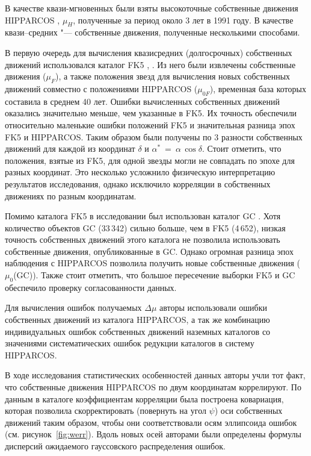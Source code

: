 В качестве квази-мгновенных были взяты высокоточные собственные движения HIPPARCOS \cite{1997ESASP1200.....E}, $\mu_{H}$, полученные за период около 3 лет в 1991 году. В качестве квази--средних "--- собственные движения, полученные несколькими способами. 

В первую очередь для вычисления квазисредних (\glqq долгосрочных\grqq ) собственных движений использовался каталог FK5 \cite{1988VeARI..32....1F}, \cite{1991VeARI..33....1F}. Из него были извлечены собственные движения ($\mu_F$), а также положения звезд для вычисления новых собственных движений совместно с положениями HIPPARCOS ($\mu_{0F}$), временная база которых составила в среднем 40 лет. Ошибки вычисленных собственных движений оказались значительно меньше, чем указанные в FK5. Их точность обеспечили относительно маленькие ошибки положений FK5 и значительная разница эпох FK5 и HIPPARCOS. Таким образом были получены по 3 разности собственных движений для каждой из координат $\delta$  и $\alpha ^*$~=~$\alpha\,\cos\delta$. Стоит отметить, что положения, взятые из FK5, для одной звезды могли не совпадать по эпохе для разных координат. Это несколько усложнило физическую интерпретацию результатов исследования, однако исключило корреляции в собственных движениях по разным координатам.

Помимо каталога FK5 в исследовании был использован каталог GC \cite{1936gcts.book.....B}. Хотя количество объектов GC (33\,342) сильно больше, чем в FK5 (4\,652), низкая точность собственных движений этого каталога не позволила использовать собственные движения, опубликованные в GC. Однако огромная разница эпох наблюдения с HIPPARCOS позволила получить новые собственные движения ($\mu_{0}$(GC)). Также стоит отметить, что большое пересечение выборки FK5 и GC обеспечило проверку согласованности данных.

Для вычисления ошибок получаемых $\Delta\mu$ авторы использовали ошибки собственных движений из каталога HIPPARCOS, а так же комбинацию индивидуальных ошибок собственных движений наземных каталогов со значениями систематических ошибок редукции каталогов в систему HIPPARCOS.

В ходе исследования статистических особенностей данных авторы учли тот факт, что собственные движения HIPPARCOS по двум координатам коррелируют. По данным в каталоге коэффициентам корреляции была построена ковариация, которая позволила скорректировать (повернуть на угол $\psi$) оси собственных движений таким образом, чтобы они соответствовали осям эллипсоида ошибок (см. рисунок~\ref{fig:werr}). Вдоль новых осей авторами были определены формулы дисперсий ожидаемого гауссовского распределения ошибок.

